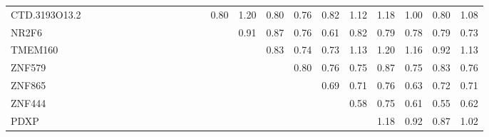 \begin{longtable}{lrrrrrrrrrrrrrrrrrrrrrr}
CTD.3193O13.2 &            &             &            &               &             &               &              &             &              &             &                &                     &        0.80 &          1.20 &         0.80 &         0.76 &         0.82 &       1.12 &         1.18 &           1.00 &         0.80 &         1.08 \\
NR2F6         &            &             &            &               &             &               &              &             &              &             &                &                     &             &          0.91 &         0.87 &         0.76 &         0.61 &       0.82 &         0.79 &           0.78 &         0.79 &         0.73 \\
TMEM160       &            &             &            &               &             &               &              &             &              &             &                &                     &             &               &         0.83 &         0.74 &         0.73 &       1.13 &         1.20 &           1.16 &         0.92 &         1.13 \\
ZNF579        &            &             &            &               &             &               &              &             &              &             &                &                     &             &               &              &         0.80 &         0.76 &       0.75 &         0.87 &           0.75 &         0.83 &         0.76 \\
ZNF865        &            &             &            &               &             &               &              &             &              &             &                &                     &             &               &              &              &         0.69 &       0.71 &         0.76 &           0.63 &         0.72 &         0.71 \\
ZNF444        &            &             &            &               &             &               &              &             &              &             &                &                     &             &               &              &              &              &       0.58 &         0.75 &           0.61 &         0.55 &         0.62 \\
PDXP          &            &             &            &               &             &               &              &             &              &             &                &                     &             &               &              &              &              &            &         1.18 &           0.92 &         0.87 &         1.02 \\

\end{longtable}

